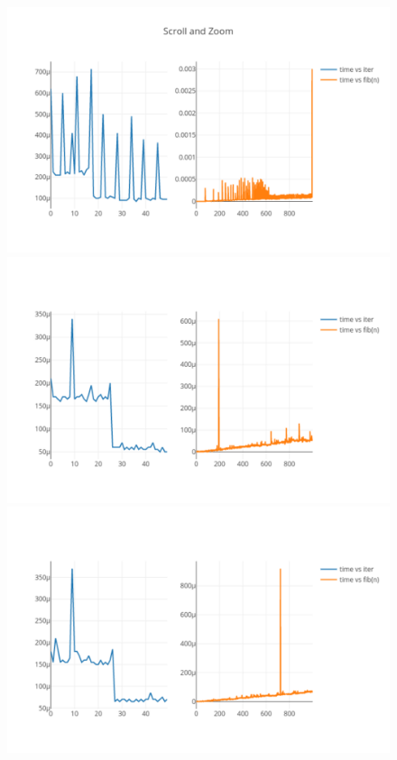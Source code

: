 \documentclass[onecolumn]{preport}
\begin{document}
\begin{figure}[H]
  \begin{center}
    \begin{minipage}{0.23\columnwidth}   
      \includegraphics[width=\columnwidth]{figs/newplot1.pdf}
      \subcaption{}
    \end{minipage}
    \begin{minipage}{0.23\columnwidth}   
      \includegraphics[width=\columnwidth]{figs/newplot2.pdf}
      \subcaption{}
    \end{minipage}
    \begin{minipage}{0.23\columnwidth}   
      \includegraphics[width=\columnwidth]{figs/newplot3.pdf}

\end{minipage}
\end{center}
\end{figure}
\end{document}

